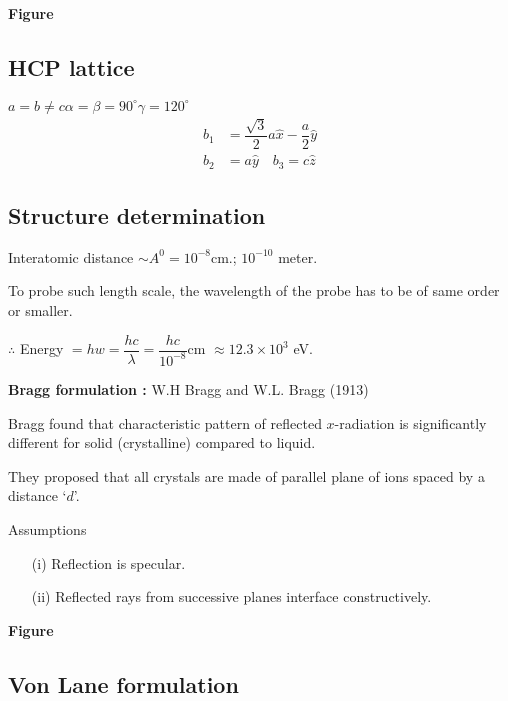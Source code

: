 \chapter{}\label{lec14}

\begin{center}
{\bf Figure}
\end{center}

\section*{HCP lattice}
$a=b\neq c$\quad $\alpha=\beta=90^{\circ}$\quad $\gamma=120^{\circ}$
\begin{align*}
b_{1} &= \dfrac{\sqrt{3}}{2}a\widehat{x}-\dfrac{a}{2}\widehat{y}\\
b_{2} &= a\widehat{y}\quad b_{3}=c\widehat{z}
\end{align*}

\section*{Structure determination}

Interatomic distance $\sim A^{0}=10^{-8}$cm.; $10^{-10}$ meter.

To probe such length scale, the wavelength of the probe has to be of same order or smaller.

$\therefore$ Energy $=hw=\dfrac{hc}{\lambda}=\dfrac{hc}{10^{-8}}$cm $\approx 12.3\times 10^{3}$ eV.

\medskip
\noindent
{\bf Bragg formulation :} W.H Bragg and W.L. Bragg (1913)

Bragg found that characteristic pattern of reflected $x$-radiation is significantly different for solid (crystalline) compared to liquid.

They proposed that all crystals are made of parallel plane of ions spaced by a distance `$d$'.

Assumptions
\begin{itemize}
\item[(i)] Reflection is specular.

\item[(ii)] Reflected rays from successive planes interface constructively.
\end{itemize}
\begin{center}
{\bf Figure}
\end{center}

\section*{Von Lane formulation}

